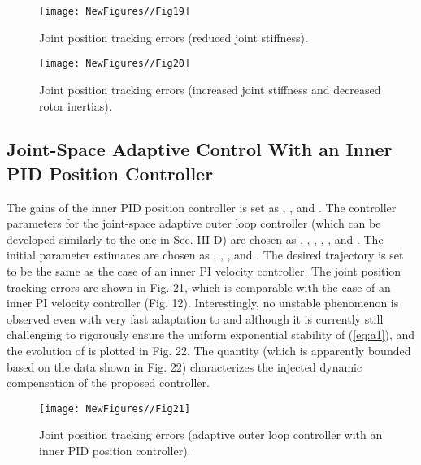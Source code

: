 \documentclass[9pt,technote]{IEEEtran}
\begin{document}
{\begin{figure}
\centering
\begin{minipage}[t]{1.0\linewidth}
\centering
\texttt{[image: NewFigures//Fig19]}
\caption{Joint position tracking errors (reduced joint stiffness).}\label{fig:side:a}
\end{minipage}\end{figure}

\begin{figure}
\centering
\begin{minipage}[t]{1.0\linewidth}
\centering
\texttt{[image: NewFigures//Fig20]}
\caption{Joint position tracking errors (increased joint stiffness and decreased rotor inertias).}\label{fig:side:a}
\end{minipage}\end{figure}

\subsection{Joint-Space Adaptive Control With an Inner PID Position Controller}

The gains of the inner PID position controller is set as , , and . The controller parameters for the joint-space adaptive outer loop controller (which can be developed similarly to the one in Sec. III-D) are chosen as , ,
, , , and . The initial parameter estimates are chosen as
, , , and . The desired trajectory is set to
be the same as
the case of an inner PI velocity controller. The joint position tracking errors are shown in Fig. 21, which is comparable with
the case of an inner PI velocity controller (Fig. 12). Interestingly, no unstable phenomenon is observed even with very fast adaptation to  and  although it is currently still challenging to rigorously
ensure the uniform exponential stability of (\ref{eq:a1}), and the evolution of  is plotted in Fig. 22. The quantity  (which is
apparently bounded based on the data shown in Fig. 22) characterizes the injected dynamic compensation of the proposed controller.

\begin{figure}
\centering
\begin{minipage}[t]{1.0\linewidth}
\centering
\texttt{[image: NewFigures//Fig21]}
\caption{Joint position tracking errors (adaptive outer loop controller with an inner PID position controller).}\label{fig:side:a}
\end{minipage}\end{figure}


}
\end{document}
